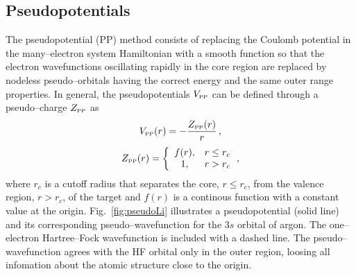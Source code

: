 \documentclass[10pt]{article}
\begin{document}
\subsection{Pseudopotentials}
\label{sec:PPs}

The pseudopotential (PP) method consists of replacing the Coulomb 
potential in the many--electron system Hamiltonian with a smooth 
function so that the electron wavefunctions oscillating rapidly in 
the core region are replaced by nodeless pseudo--orbitals having the 
correct energy and the same outer range properties.
In general, the pseudopotentials $V_{\mbox{\tiny PP}}$ can be defined 
through a pseudo--charge $Z_{\mbox{\tiny PP}}$ as
\begin{equation}
 V_{\mbox{\tiny PP}}(r)=-\frac{Z_{\mbox{\tiny PP}}(r)}{r} \,,
 \label{eq:pseudopotential}
\end{equation}
\begin{equation}
 Z_{\mbox{\tiny PP}}(r)=\bigg\{
 \begin{array}{cl}
  f(r), & r\leq r_c \\
  1, & r>r_c 
 \end{array} 
 \,,
 \label{eq:pseudocharge}
\end{equation}
where $r_c$ is a cutoff radius that separates the core, $r\leq r_c$,
from the valence region, $r>r_c$, of the target and $f(r)$ is a 
continous function with a constant value at the origin.
Fig.~\ref{fig:pseudoLi} illustrates a pseudopotential (solid line)
and its corresponding pseudo--wavefunction for the $3s$ orbital of 
argon. The one--electron Hartree--Fock wavefunction is included
with a dashed line. The pseudo--wavefunction agrees with the 
HF orbital only in the outer region, loosing all 
infomation about the atomic structure close to the origin.
\end{document}
